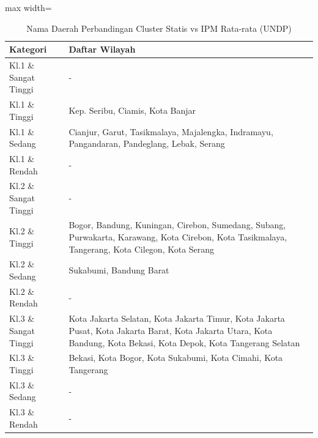 \begin{table}[H]
\centering
\caption{Nama Daerah Perbandingan Cluster Statis vs IPM Rata-rata (UNDP)} \label{tab:statis_ipm_avg_name}
\begin{adjustbox}{max width=\textwidth}
\begin{tabular}{|p{4cm}|p{10cm}|}
\hline
\textbf{Kategori} & \textbf{Daftar Wilayah} \\
\hline
Kl.1 \& Sangat Tinggi & - \\
\hline
Kl.1 \& Tinggi & Kep. Seribu, Ciamis, Kota Banjar \\
\hline
Kl.1 \& Sedang & Cianjur, Garut, Tasikmalaya, Majalengka, Indramayu, Pangandaran, Pandeglang, Lebak, Serang \\
\hline
Kl.1 \& Rendah & - \\
\hline
Kl.2 \& Sangat Tinggi & - \\
\hline
Kl.2 \& Tinggi & Bogor, Bandung, Kuningan, Cirebon, Sumedang, Subang, Purwakarta, Karawang, Kota Cirebon, Kota Tasikmalaya, Tangerang, Kota Cilegon, Kota Serang \\
\hline
Kl.2 \& Sedang & Sukabumi, Bandung Barat \\
\hline
Kl.2 \& Rendah & - \\
\hline
Kl.3 \& Sangat Tinggi & Kota Jakarta Selatan, Kota Jakarta Timur, Kota Jakarta Pusat, Kota Jakarta Barat, Kota Jakarta Utara, Kota Bandung, Kota Bekasi, Kota Depok, Kota Tangerang Selatan \\
\hline
Kl.3 \& Tinggi & Bekasi, Kota Bogor, Kota Sukabumi, Kota Cimahi, Kota Tangerang \\
\hline
Kl.3 \& Sedang & - \\
\hline
Kl.3 \& Rendah & - \\
\hline
\end{tabular}
\end{adjustbox}
\end{table}
